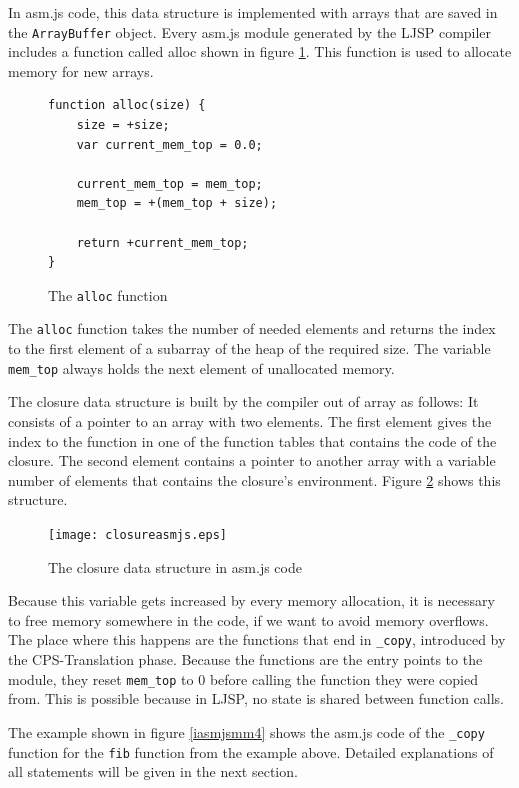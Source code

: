 \documentclass[11pt]{report}
\begin{document}
In asm.js code, this data structure is implemented with arrays that are saved in the \texttt{ArrayBuffer} object. Every asm.js module generated by the LJSP compiler includes a function called alloc shown in figure \ref{iasmjsmm3}. This function is used to allocate memory for new arrays.

\begin{figure}[ht]
\begin{lstlisting}
function alloc(size) {
    size = +size;
    var current_mem_top = 0.0;

    current_mem_top = mem_top;
    mem_top = +(mem_top + size);

    return +current_mem_top;
}
\end{lstlisting}
\caption{The \texttt{alloc} function}
\label{iasmjsmm3}
\end{figure}

The \texttt{alloc} function takes the number of needed elements and returns the index to the first element of a subarray of the heap of the required size. The variable \texttt{mem_top} always holds the next element of unallocated memory.

The closure data structure is built by the compiler out of array as follows: It consists of a pointer to an array with two elements. The first element gives the index to the function in one of the function tables that contains the code of the closure. The second element contains a pointer to another array with a variable number of elements that contains the closure's environment. Figure \ref{asmjsclosure} shows this structure.

\begin{figure}[ht]
\begin{center}
\texttt{[image: closureasmjs.eps]}
\end{center}
\caption{The closure data structure in asm.js code}
\label{asmjsclosure}
\end{figure}


Because this variable gets increased by every memory allocation, it is necessary to free memory somewhere in the code, if we want to avoid memory overflows. The place where this happens are the functions that end in \texttt{_copy}, introduced by the CPS-Translation phase. Because the functions are the entry points to the module, they reset \texttt{mem_top} to $0$ before calling the function they were copied from. This is possible because in LJSP, no state is shared between function calls.

The example shown in figure \ref{iasmjsmm4} shows the asm.js code of the \texttt{_copy} function for the \texttt{fib} function from the example above. Detailed explanations of all statements will be given in the next section.
\end{document}
